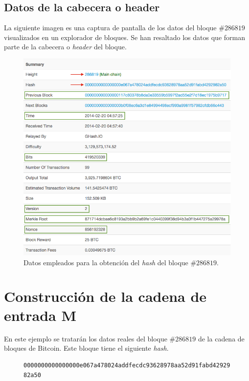 \documentclass{article}
\begin{document}
    \subsection{Datos de la cabecera o header}
    La siguiente imagen es una captura de pantalla de los datos del bloque $\#286819$ visualizados en un explorador de bloques. Se han resaltado los datos que forman parte de la cabecera o \textit{header} del bloque.
    \begin{figure}[H]
    \centering
        \includegraphics[scale=0.47]{img/Bitcoin_block_SHA_256_Block_Data}
        \caption{Datos empleados para la obtención del \textit{hash} del bloque \#$286819$.}
    \end{figure}
    
    \vspace{3mm}
    
\section{Construcción de la cadena de entrada M}
    En este ejemplo se tratarán los datos reales del bloque $\#286819$ de la cadena de bloques de Bitcoin. Este bloque tiene el siguiente \textit{hash}.
    
    \begin{figure}[H]
        \centering
        \scriptsize{
        \texttt{0000000000000000e067a478024addfecdc93628978aa52d91fabd4292982a50}
        }
    \end{figure}
    
\end{document}
